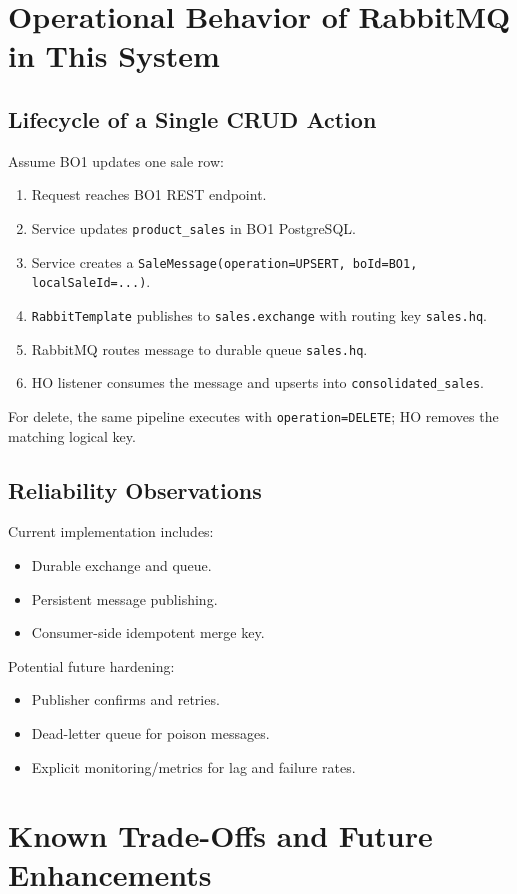 \documentclass[11pt,a4paper]{article}
\begin{document}
\section{Operational Behavior of RabbitMQ in This System}
\subsection{Lifecycle of a Single CRUD Action}
Assume BO1 updates one sale row:
\begin{enumerate}[leftmargin=*]
  \item Request reaches BO1 REST endpoint.
  \item Service updates \texttt{product\_sales} in BO1 PostgreSQL.
  \item Service creates a \texttt{SaleMessage(operation=UPSERT, boId=BO1, localSaleId=...)}.
  \item \texttt{RabbitTemplate} publishes to \texttt{sales.exchange} with routing key \texttt{sales.hq}.
  \item RabbitMQ routes message to durable queue \texttt{sales.hq}.
  \item HO listener consumes the message and upserts into \texttt{consolidated\_sales}.
\end{enumerate}

For delete, the same pipeline executes with \texttt{operation=DELETE}; HO removes the matching logical key.

\subsection{Reliability Observations}
Current implementation includes:
\begin{itemize}[leftmargin=*]
  \item Durable exchange and queue.
  \item Persistent message publishing.
  \item Consumer-side idempotent merge key.
\end{itemize}

Potential future hardening:
\begin{itemize}[leftmargin=*]
  \item Publisher confirms and retries.
  \item Dead-letter queue for poison messages.
  \item Explicit monitoring/metrics for lag and failure rates.
\end{itemize}

\section{Known Trade-Offs and Future Enhancements}
\end{document}
